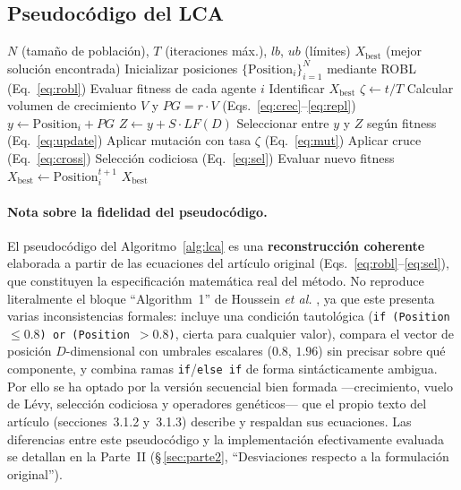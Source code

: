 \subsection{Pseudocódigo del LCA}

\begin{algorithm}[H]
\caption{Liver Cancer Algorithm (LCA)}
\label{alg:lca}
\begin{algorithmic}[1]
\Require $N$ (tamaño de población), $T$ (iteraciones máx.), $lb$, $ub$ (límites)
\Ensure $X_{\text{best}}$ (mejor solución encontrada)
\State Inicializar posiciones $\{\text{Position}_i\}_{i=1}^N$ mediante ROBL (Eq.~\ref{eq:robl})
\State Evaluar fitness de cada agente $i$
\State Identificar $X_{\text{best}}$
  \State $\zeta \leftarrow t / T$ 
    \State Calcular volumen de crecimiento $V$ y $PG = r\cdot V$ (Eqs.~\ref{eq:crec}--\ref{eq:repl})
    \State $y \leftarrow \text{Position}_i + PG$ 
    \State $Z \leftarrow y + S\cdot LF(D)$ 
    \State Seleccionar entre $y$ y $Z$ según fitness (Eq.~\ref{eq:update})
    \State Aplicar mutación con tasa $\zeta$ (Eq.~\ref{eq:mut})
    \State Aplicar cruce (Eq.~\ref{eq:cross})
    \State Selección codiciosa (Eq.~\ref{eq:sel})
    \State Evaluar nuevo fitness
      \State $X_{\text{best}} \leftarrow \text{Position}_i^{t+1}$
    \EndIf
  \EndFor
\EndFor
\State \Return $X_{\text{best}}$
\end{algorithmic}
\end{algorithm}

\paragraph{Nota sobre la fidelidad del pseudocódigo.}
El pseudocódigo del Algoritmo~\ref{alg:lca} es una \textbf{reconstrucción coherente}
elaborada a partir de las ecuaciones del artículo original (Eqs.~\ref{eq:robl}--\ref{eq:sel}),
que constituyen la especificación matemática real del método. No reproduce literalmente el
bloque ``Algorithm~1'' de Houssein \emph{et al.} \cite{houssein2023lca}, ya que este presenta
varias inconsistencias formales: incluye una condición tautológica
(\texttt{if (Position $\le 0.8$) or (Position $>0.8$)}, cierta para cualquier valor), compara
el vector de posición $D$-dimensional con umbrales escalares ($0.8$, $1.96$) sin precisar sobre
qué componente, y combina ramas \texttt{if}/\texttt{else if} de forma sintácticamente ambigua.
Por ello se ha optado por la versión secuencial bien formada ---crecimiento, vuelo de Lévy,
selección codiciosa y operadores genéticos--- que el propio texto del artículo (secciones~3.1.2
y~3.1.3) describe y respaldan sus ecuaciones. Las diferencias entre este pseudocódigo y la
implementación efectivamente evaluada se detallan en la Parte~II
(\S\,\ref{sec:parte2}, ``Desviaciones respecto a la formulación original'').


